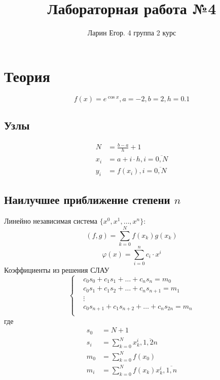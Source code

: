 \documentclass{article}
\title{Лабораторная работа №4}
\author{Ларин Егор. 4 группа 2 курс}
\begin{document}
\maketitle
\section*{Теория}
\begin{equation*}
    f(x) = e ^ {\cos x}, a = -2, b = 2, h = 0.1
\end{equation*}
\subsection*{Узлы}
\begin{equation*}
    \begin{split}
    N &= \frac{b-a}{h} + 1\\
    x_i &= a + i\cdot h, i = \overline{0, N}\\
    y_i &= f(x_i), i = \overline{0, N}
    \end{split}
\end{equation*}
\subsection*{Наилучшее приближение степени $n$}
     Линейно независимая система $\{x^0, x^1, \dots, x^n\}$:
     \begin{equation*}
         (f,g) = \sum_{k=0}^N f(x_k)g(x_k)
     \end{equation*}
\begin{equation*}
    \varphi (x) = \sum_{i=0}^n c_i \cdot x^i
\end{equation*}
Коэффициенты из решения СЛАУ
\begin{equation*}
\begin{cases}
    &c_0s_0 + c_1s_1 + \dots + c_ns_n = m_0\\
    &c_0s_1 + c_1s_2 + \dots + c_ns_{n+1} = m_1\\
    &\vdots \\
    &c_0s_{n+1} + c_1s_{n+2} + \dots + c_ns_{2n} = m_n\\
\end{cases}
\end{equation*} где
\begin{equation*}
    \begin{split}
    s_0 &= N+1\\
    s_i &= \sum_{k=0}^N x_k ^ i, \overline{1, 2n}\\
    m_0 &= \sum_{k=0}^N f(x_0)\\
    m_i &= \sum_{k=0}^N f(x_k)x_k ^ i, \overline{1, n}
    \end{split}
\end{equation*}
\end{document}
